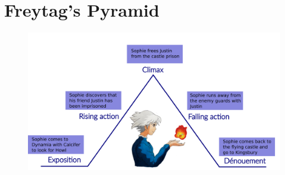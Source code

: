 \section{Freytag's Pyramid}
\begin{center}
  \begin{figure}[H]
    \centering
    \includegraphics[width=12cm]{Images/Diagrams/freytagPyramid}
  \end{figure}
\end{center}
